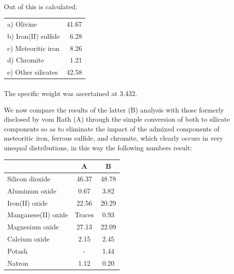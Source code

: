 \documentclass[a4paper, 12pt, oneside]{article}
\begin{document}
\paragraph*{}
Out of this is calculated:
\begin{center}
    \begin{tabular}{l r}
        a) Olivine & 41.67\\
        b) Iron(II) sulfide & 6.28\\
        c) Meteoritic iron & 8.26\\
        d) Chromite & 1.21\\
        e) Other silicates & 42.58\\
    \end{tabular}
\end{center}
\paragraph*{}
The specific weight was ascertained at 3.432.

We now compare the results of the latter (B) analysis with those formerly disclosed by vom Rath (A) through the simple conversion of both to silicate components so as to eliminate the impact of the admixed components of meteoritic iron, ferrous sulfide, and chromite, which clearly occurs in very unequal distributions, in this way the following numbers result:
\begin{center}
    \begin{tabular}{ |l|c|c| }
        \hline
         & A & B\\\hline
        Silicon dioxide & 46.37 & 48.78\\\hline
        Aluminum oxide & 0.67 & 3.82\\\hline
        Iron(II) oxide & 22.56 & 20.29\\\hline
        Manganese(II) oxide & Traces & 0.93\\\hline
        Magnesium oxide & 27.13 & 22.09\\\hline
        Calcium oxide & 2.15 & 2.45\\\hline
        Potash & - & 1.44\\\hline
        Natron & 1.12 & 0.20\\
        \hline
    \end{tabular}
\end{center}
\end{document}
